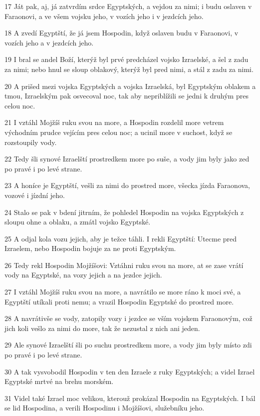 \par 17 Ját pak, aj, já zatvrdím srdce Egyptských, a vejdou za nimi; i budu oslaven v Faraonovi, a ve všem vojsku jeho, v vozích jeho i v jezdcích jeho.
\par 18 A zvedí Egyptští, že já jsem Hospodin, když oslaven budu v Faraonovi, v vozích jeho a v jezdcích jeho.
\par 19 I bral se andel Boží, kterýž byl prvé predcházel vojsko Izraelské, a šel z zadu za nimi; nebo hnul se sloup oblakový, kterýž byl pred nimi, a stál z zadu za nimi.
\par 20 A prišed mezi vojska Egyptských a vojska Izraelská, byl Egyptským oblakem a tmou, Izraelským pak osvecoval noc, tak aby nepriblížili se jedni k druhým pres celou noc.
\par 21 I vztáhl Mojžíš ruku svou na more, a Hospodin rozdelil more vetrem východním prudce vejícím pres celou noc; a ucinil more v suchost, když se rozstoupily vody.
\par 22 Tedy šli synové Izraelští prostredkem more po suše, a vody jim byly jako zed po pravé i po levé strane.
\par 23 A honíce je Egyptští, vešli za nimi do prostred more, všecka jízda Faraonova, vozové i jízdní jeho.
\par 24 Stalo se pak v bdení jitrním, že pohledel Hospodin na vojska Egyptských z sloupu ohne a oblaku, a zmátl vojsko Egyptské.
\par 25 A odjal kola vozu jejich, aby je težce táhli. I rekli Egyptští: Utecme pred Izraelem, nebo Hospodin bojuje za ne proti Egyptským.
\par 26 Tedy rekl Hospodin Mojžíšovi: Vztáhni ruku svou na more, at se zase vrátí vody na Egyptské, na vozy jejich a na jezdce jejich.
\par 27 I vztáhl Mojžíš ruku svou na more, a navrátilo se more ráno k moci své, a Egyptští utíkali proti nemu; a vrazil Hospodin Egyptské do prostred more.
\par 28 A navrátivše se vody, zatopily vozy i jezdce se vším vojskem Faraonovým, což jich koli vešlo za nimi do more, tak že nezustal z nich ani jeden.
\par 29 Ale synové Izraelští šli po suchu prostredkem more, a vody jim byly místo zdi po pravé i po levé strane.
\par 30 A tak vysvobodil Hospodin v ten den Izraele z ruky Egyptských; a videl Izrael Egyptské mrtvé na brehu morském.
\par 31 Videl také Izrael moc velikou, kterouž prokázal Hospodin na Egyptských. I bál se lid Hospodina, a verili Hospodinu i Mojžíšovi, služebníku jeho.

